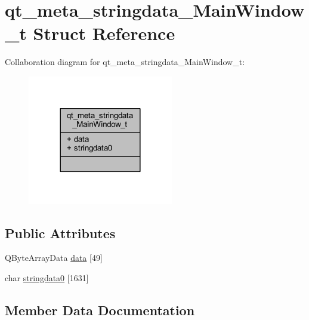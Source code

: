 \hypertarget{structqt__meta__stringdata___main_window__t}{}\section{qt\+\_\+meta\+\_\+stringdata\+\_\+\+Main\+Window\+\_\+t Struct Reference}
\label{structqt__meta__stringdata___main_window__t}


Collaboration diagram for qt\+\_\+meta\+\_\+stringdata\+\_\+\+Main\+Window\+\_\+t\+:\nopagebreak
\begin{figure}[H]
\begin{center}
\leavevmode
\includegraphics[width=180pt]{structqt__meta__stringdata___main_window__t__coll__graph}
\end{center}
\end{figure}
\subsection*{Public Attributes}
\begin{DoxyCompactItemize}
\item 
Q\+Byte\+Array\+Data \hyperlink{structqt__meta__stringdata___main_window__t_ae6584281bf9549429425a8e77379ab87}{data} \mbox{[}49\mbox{]}
\item 
char \hyperlink{structqt__meta__stringdata___main_window__t_a2155dbbc86834094a09943c561c7c5a7}{stringdata0} \mbox{[}1631\mbox{]}
\end{DoxyCompactItemize}


\subsection{Member Data Documentation}
\mbox{\label{structqt__meta__stringdata___main_window__t_ae6584281bf9549429425a8e77379ab87}} 
